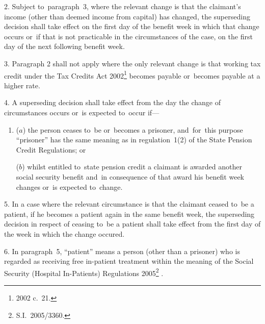 \documentclass[12pt,a4paper]{article}
\begin{document}
\medskip

2.  Subject to~paragraph~3, where the relevant change is that the claimant’s income (other than deemed income from capital) has changed, the superseding decision shall take effect on the first day of the benefit week in which that change occurs or~if that is not practicable in the circumstances of the case, on the first day of the next following benefit week.

\medskip

3.  Paragraph 2 shall not apply where the only relevant change is that working tax credit under the Tax Credits Act 2002\footnote{2002 c.\ 21.} becomes payable or~becomes payable at a higher rate.

\medskip

4.  A superseding decision shall take effect from the day the change of circumstances occurs or~is expected to~occur if—
\begin{enumerate}\item[]
($a$) the person ceases to~be or~becomes a prisoner, and~for~this purpose “prisoner” has the same meaning as in regulation~1(2) of the State Pension Credit Regulations; or

($b$) whilst entitled to~state pension credit a claimant is awarded another social security benefit and~in consequence of that award his benefit week changes or~is expected to~change.
\end{enumerate}

\medskip


5.  In a case where the relevant circumstance is that the claimant ceased to~be a patient, if he becomes a patient again in the same benefit week, the superseding decision in respect of ceasing to~be a patient shall take effect from the first day of the week in which the change occured.


\medskip

6.  In paragraph~5, “patient” means a person (other than a prisoner) who is regarded as receiving free in-patient treatment within the meaning of the 
Social Security (Hospital In-Patients) Regulations 2005\footnote{S.I.~2005/3360.}%
.
\end{document}
